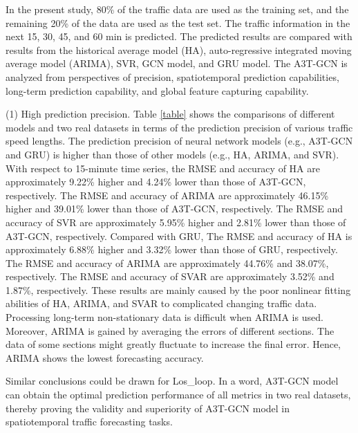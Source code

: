 \documentclass[10pt,journal,compsoc]{IEEEtran}
\begin{document}
\par In the present study, 80\% of the traffic data are used as the training set, and the remaining 20\% of the data are used as the test set. The traffic information in the next 15, 30, 45, and 60 min is predicted. The predicted results are compared with results from the historical average model (HA), auto-regressive integrated moving average model (ARIMA), SVR, GCN model, and GRU model. The A3T-GCN is analyzed from perspectives of precision, spatiotemporal prediction capabilities, long-term prediction capability, and global feature capturing capability.
\par (1) High prediction precision. Table \ref{table} shows the comparisons of different models and two real datasets in terms of the prediction precision of various traffic speed lengths. The prediction precision of neural network models (e.g., A3T-GCN and GRU) is higher than those of other models (e.g., HA, ARIMA, and SVR). With respect to 15-minute time series, the RMSE and accuracy of HA are approximately 9.22\% higher and 4.24\% lower than those of A3T-GCN, respectively. The RMSE and accuracy of ARIMA are approximately 46.15\% higher and 39.01\% lower than those of A3T-GCN, respectively. The RMSE and accuracy of SVR are  approximately 5.95\% higher and 2.81\% lower than those of A3T-GCN, respectively. Compared with GRU, The RMSE and accuracy of HA is approximately 6.88\% higher and 3.32\% lower than those of GRU, respectively. The RMSE and accuracy of ARIMA are approximately 44.76\%  and 38.07\%, respectively. The RMSE and accuracy of SVAR are approximately 3.52\% and 1.87\%, respectively. These results are mainly caused by the poor nonlinear fitting abilities of HA, ARIMA, and SVAR to complicated changing traffic data. Processing long-term non-stationary data is difficult when ARIMA is used. Moreover, ARIMA is gained by averaging the errors of different sections. The data of some sections might greatly fluctuate to increase the final error. Hence, ARIMA shows the lowest forecasting accuracy.
\par Similar conclusions could be drawn for Los\_loop. In a word, A3T-GCN model can obtain the optimal prediction performance of all metrics in two real datasets, thereby proving the validity and superiority of A3T-GCN model in spatiotemporal traffic forecasting tasks. 
\end{document}

